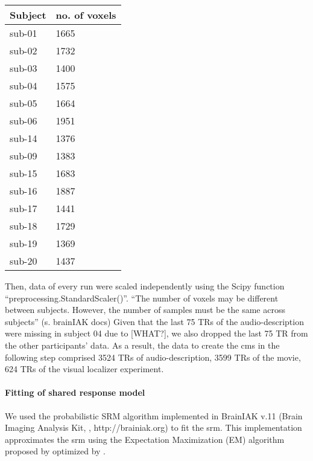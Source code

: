 \begin{table*}[btp]
    \caption{Number of voxels within the union of individual \acp{ppa} that was
    warped from MNI space into each individual's subjects-space.}
\label{tab:ppamaskvoxels}
\begin{tabular}{ll}
\toprule
\textbf{Subject} & \textbf{no. of voxels} \\
\midrule
sub-01 & 1665 \tabularnewline
sub-02 & 1732 \tabularnewline
sub-03 & 1400 \tabularnewline
sub-04 & 1575 \tabularnewline
sub-05 & 1664 \tabularnewline
sub-06 & 1951 \tabularnewline
sub-14 & 1376 \tabularnewline
sub-09 & 1383 \tabularnewline
sub-15 & 1683 \tabularnewline
sub-16 & 1887 \tabularnewline
sub-17 & 1441 \tabularnewline
sub-18 & 1729 \tabularnewline
sub-19 & 1369 \tabularnewline
sub-20 & 1437 \tabularnewline
\bottomrule
\end{tabular}
\end{table*}

Then, data of every run were scaled independently using the Scipy function
``preprocessing.StandardScaler()''.
%
``The number of voxels may be different between subjects. However, the number of
samples must be the same across subjects'' (s. brainIAK docs)
Given that the last 75 TRs of the audio-description were missing in subject 04
due to [WHAT?], we also dropped the last 75 TR from the other participants'
data.
As a result, the data to create the \ac{cms} in the following step comprised
3524 TRs of audio-description, 3599 TRs of the movie, 624 TRs of the visual
localizer experiment.



\paragraph{Fitting of shared response model}


We used the probabilistic SRM algorithm implemented in BrainIAK v.11 (Brain
Imaging Analysis Kit, \citet{kumar2020brainiak, kumar2020brainiaktutorial},
http://brainiak.org) to fit the \ac{srm}.
%
This implementation approximates the \ac{srm} using the Expectation Maximization
(EM) algorithm proposed by \citep{chen2015reduced} optimized by
\citet{anderson2016enabling}.

